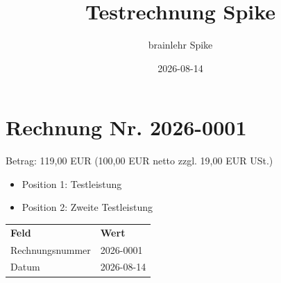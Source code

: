 \documentclass{article}
\title{Testrechnung Spike}
\author{brainlehr Spike}
\date{2026-08-14}
\begin{document}

\section{Rechnung Nr. 2026-0001}

\noindent Betrag: 119,00 EUR (100,00 EUR netto zzgl. 19,00 EUR USt.)

\begin{itemize}
  \item Position 1: Testleistung
  \item Position 2: Zweite Testleistung
\end{itemize}

\begin{tabular}{ll}
  \textbf{Feld} & \textbf{Wert} \\
  Rechnungsnummer & 2026-0001 \\
  Datum & 2026-08-14 \\
\end{tabular}
\end{document}
